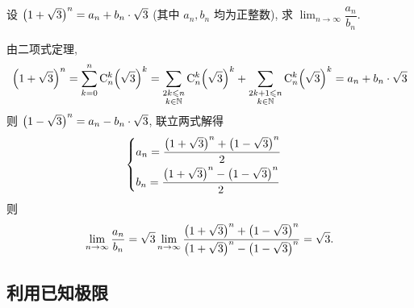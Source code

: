 \begin{example}
    设 \(\qty(1+\sqrt{3})^n=a_n+b_n\cdot\sqrt{3}\) (其中 \(a_n,b_n\) 均为正整数), 求 $\displaystyle\lim_{n\to\infty}\dfrac{a_n}{b_n}.$
\end{example}
\begin{solution}
    由二项式定理, $$\qty(1+\sqrt{3})^n=\sum_{k=0}^{n}\mathrm{C}_n^k\qty(\sqrt{3})^k=\sum_{\substack{2k\leqslant n\\k\in\mathbb{N}}}\mathrm{C}_n^k\qty(\sqrt{3})^k+\sum_{\substack{2k+1\leqslant n\\k\in\mathbb{N}}}\mathrm{C}_n^k\qty(\sqrt{3})^k=a_n+b_n\cdot\sqrt{3}$$
    则 $\qty(1-\sqrt{3})^n=a_n-b_n\cdot \sqrt{3}$, 联立两式解得
    $$\begin{cases}
            a_n=\dfrac{\qty(1+\sqrt{3})^n+\qty(1-\sqrt{3})^n}{2} \\[6pt]
            b_n=\dfrac{\qty(1+\sqrt{3})^n-\qty(1-\sqrt{3})^n}{2}
        \end{cases}$$
    则 $$\lim_{n\to\infty}\dfrac{a_n}{b_n}=\sqrt{3}\lim_{n\to\infty}\dfrac{\qty(1+\sqrt{3})^n+\qty(1-\sqrt{3})^n}{\qty(1+\sqrt{3})^n-\qty(1-\sqrt{3})^n}=\sqrt{3}.$$
\end{solution}

\subsection{利用已知极限}

